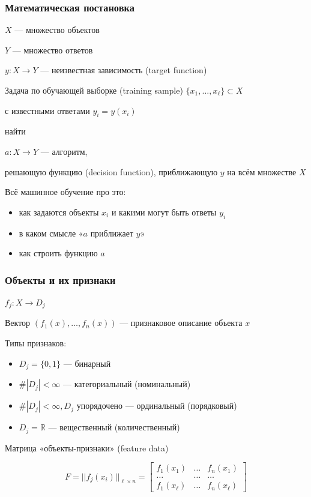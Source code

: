 \documentclass[fullscreen=true, bookmarks=true, hyperref={pdfencoding=unicode}]{beamer}
\begin{document}
\begin{frame}
  \frametitle{Математическая постановка}

  $X$ — множество объектов

  $Y$ — множество ответов

  $y: X \to Y$ — неизвестная зависимость (target function)

  \vspace{0.5cm}
  Задача по обучающей выборке (training sample) $\{x_1,\dots,x_\ell\} \subset X$

  с известными ответами $y_i=y(x_i)$

  \vspace{0.5cm}
  найти

  $a: X \to Y$ — алгоритм,

  решающую функцию (decision function), приближающую $y$ на всём множестве $X$
\end{frame}


\begin{frame}
  Всё машинное обучение про это:
  \begin{itemize}
    \item как задаются объекты $x_i$ и какими могут быть ответы $y_i$
    \item в каком смысле «$a$ приближает $y$»
    \item как строить функцию $a$
  \end{itemize}
\end{frame}


\begin{frame}
  \frametitle{Объекты и их признаки}
  $f_j: X \to D_j$

  Вектор $(f_1(x), \dots, f_n(x))$ — признаковое описание объекта $x$

  \vspace{0.5cm}
  Типы признаков:
  \begin{itemize}
    \item $D_j = \{0, 1\}$ — бинарный
    \item $\#|D_j| < \infty $ — категориальный (номинальный)
    \item $\#|D_j| < \infty, D_j$ упорядочено — ординальный (порядковый)
    \item $D_j = \mathbb{R}$ — вещественный (количественный)
  \end{itemize}

  \vspace{0.5cm}
  Матрица «объекты-признаки» (feature data)

  $$F = ||f_j(x_i)||_{\ell\times n} = \left[ {\begin{array}{ccc}
     f_1(x_1) & \dots & f_n(x_1) \\
       \dots  & \dots &   \dots  \\
     f_1(x_\ell) & \dots & f_n(x_\ell)
    \end{array} } \right]$$
\end{frame}
\end{document}
